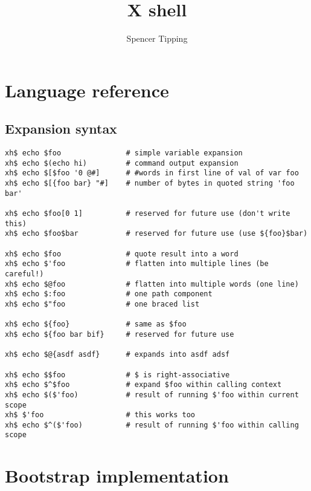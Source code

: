 \documentclass{report}
\title{X shell}
\author{Spencer Tipping}
\begin{document}
\maketitle{}
\tableofcontents{}


\part{Language reference}\label{part:language-reference}
\chapter{Expansion syntax}\label{chp:expansion-syntax}
\begin{verbatim}
xh$ echo $foo               # simple variable expansion
xh$ echo $(echo hi)         # command output expansion
xh$ echo $[$foo '0 @#]      # #words in first line of val of var foo
xh$ echo $[{foo bar} "#]    # number of bytes in quoted string 'foo bar'

xh$ echo $foo[0 1]          # reserved for future use (don't write this)
xh$ echo $foo$bar           # reserved for future use (use ${foo}$bar)

xh$ echo $foo               # quote result into a word
xh$ echo $'foo              # flatten into multiple lines (be careful!)
xh$ echo $@foo              # flatten into multiple words (one line)
xh$ echo $:foo              # one path component
xh$ echo $"foo              # one braced list

xh$ echo ${foo}             # same as $foo
xh$ echo ${foo bar bif}     # reserved for future use

xh$ echo $@{asdf asdf}      # expands into asdf adsf

xh$ echo $$foo              # $ is right-associative
xh$ echo $^$foo             # expand $foo within calling context
xh$ echo $($'foo)           # result of running $'foo within current scope
xh$ $'foo                   # this works too
xh$ echo $^($'foo)          # result of running $'foo within calling scope
\end{verbatim}

\part{Bootstrap implementation}\label{part:bootstrap-implementation}
\end{document}
